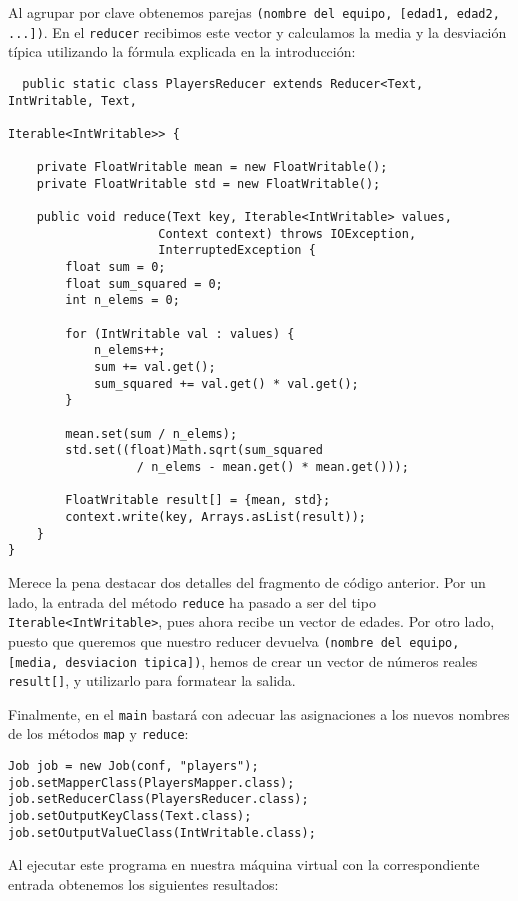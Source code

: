 \documentclass[11pt]{article}
\def\inline{\lstinline[basicstyle=\ttfamily,keywordstyle={}]}
\begin{document}
Al agrupar por clave obtenemos parejas \inline{(nombre del equipo, [edad1, edad2, ...])}. En el \inline{reducer} recibimos este vector y calculamos la media y la desviación típica utilizando la fórmula explicada en la introducción:

\begin{verbatim}
  public static class PlayersReducer extends Reducer<Text, IntWritable, Text,
                                                     Iterable<IntWritable>> {
	
	private FloatWritable mean = new FloatWritable();
	private FloatWritable std = new FloatWritable();
	
	public void reduce(Text key, Iterable<IntWritable> values,
                     Context context) throws IOException,
                     InterruptedException {
		float sum = 0;
		float sum_squared = 0;
		int n_elems = 0;
		
		for (IntWritable val : values) {
			n_elems++;
			sum += val.get();
			sum_squared += val.get() * val.get();
		}
		
		mean.set(sum / n_elems);
		std.set((float)Math.sqrt(sum_squared
                  / n_elems - mean.get() * mean.get()));
		
		FloatWritable result[] = {mean, std};
		context.write(key, Arrays.asList(result));
	}
}
\end{verbatim}

Merece la pena destacar dos detalles del fragmento de código anterior. Por un lado, la entrada del método \inline{reduce} ha pasado a ser del tipo \inline{Iterable<IntWritable>}, pues ahora recibe un vector de edades. Por otro lado, puesto que queremos que nuestro reducer devuelva \inline{(nombre del equipo, [media, desviacion tipica])}, hemos de crear un vector de números reales \inline{result[]}, y utilizarlo para formatear la salida.

Finalmente, en el \inline{main} bastará con adecuar las asignaciones a los nuevos nombres de los métodos \inline{map} y \inline{reduce}:

\begin{verbatim}
Job job = new Job(conf, "players");
job.setMapperClass(PlayersMapper.class);
job.setReducerClass(PlayersReducer.class);
job.setOutputKeyClass(Text.class);
job.setOutputValueClass(IntWritable.class);
\end{verbatim}

Al ejecutar este programa en nuestra máquina virtual con la correspondiente entrada obtenemos los siguientes resultados:
\end{document}
